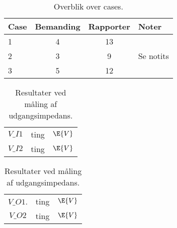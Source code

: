 \begin{table}[H]
	\centering
	\begin{tabular}{lccl}	%
		\toprule
		Case & Bemanding & Rapporter & Noter \\\midrule
		1 & 4 & 13 &            \\
		2 & 3 & 9  & Se notits  \\
		3 & 5 & 12 &            \\
		\bottomrule
	\end{tabular}
	\caption{Overblik over cases.}
	\label{tab:cases}
\end{table}

\begin{table}[H]
    \caption{Resultat af impedans målinger.}
    \label{tab:accepttestImpedansJournal}
    \begin{subtable}[h]{0.50\textwidth}
        \centering
        \caption{Resultater ved måling af indgangsimpedans.}
        \begin{tabular}{|c|c|c|}
        \hline
        \rowcolor{gray!50} \multicolumn{3}{|c|}{\textbf{Indgangsimpedans}}\\
        \hline
        $V\_{I1}$  & ting & $\E{V}$\\
        \hline
        $V\_{I2}$ & ting & $\E{V}$\\
        \hline
       \end{tabular}
       \label{tab:accepttestInputImpedansJournal}
    \end{subtable}
    \hfill
    \begin{subtable}[h]{0.50\textwidth}
        \centering
        \caption{Resultater ved måling af udgangsimpedans.}
        \begin{tabular}{|c|c|c|}
        \hline
        \rowcolor{gray!50} \multicolumn{3}{|c|}{\textbf{Udgangsimpedans}}\\
        \hline
        $V\_{O1}$. & ting & $\E{V}$\\
        \hline
        $V\_{O2}$ & ting & $\E{V}$\\
        \hline
       \end{tabular}
       \label{tab:accepttestOutputImpedansJournal}
     \end{subtable}
\end{table}

